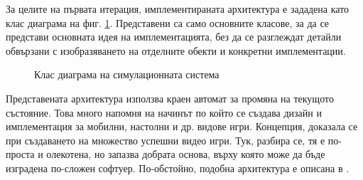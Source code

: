 		За целите на първата итерация, имплементираната архитектура е зададена като клас диаграма на фиг. \ref{figure:simulation-class-diagram}.
		Представени са само основните класове, за да се представи основната идея на имплементацията, без
		да се разглеждат детайли обвързани с изобразяването на отделните обекти и конкретни имплементации.
		
		\begin{figure}
			\caption{Клас диаграма на симулационната система}
			\label{figure:simulation-class-diagram}
				\begin{center}
				\end{center}
		\end{figure}
		
		\newpage
		
		Представената архитектура използва краен автомат за промяна на текущото състояние.
		Това много напомня на начинът по който се създава дизайн и имплементация за мобилни, настолни
		и др. видове игри. Концепция, доказала се при създаването на множество успешни видео игри. 
		Тук, разбира се, тя е по-проста и олекотена, но запазва добрата основа, 
		върху която може да бъде изградена по-сложен софтуер. По-обстойно, подобна архитектура е описана в \cite{Rollings}.
		

